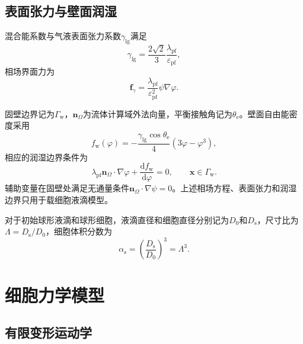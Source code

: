 \subsection{表面张力与壁面润湿}

混合能系数与气液表面张力系数$\gamma_{\mathrm{lg}}$满足
\begin{equation}
\gamma_{\mathrm{lg}}
=
\frac{2\sqrt{2}}{3}
\frac{\lambda_{\mathrm{pf}}}{\varepsilon_{\mathrm{pf}}},
\label{eq:ch2_surface_tension_relation}
\end{equation}
相场界面力为
\begin{equation}
\boldsymbol{f}_{\gamma}
=
\frac{\lambda_{\mathrm{pf}}}{\varepsilon_{\mathrm{pf}}^2}
\psi\nabla\varphi.
\label{eq:ch2_phase_surface_force}
\end{equation}

固壁边界记为$\Gamma_{\mathrm w}$，$\boldsymbol{n}_{\Omega}$为流体计算域外法向量，平衡接触角记为$\theta_{\mathrm e}$。壁面自由能密度采用
\begin{equation}
f_{\mathrm w}(\varphi)
=
-\frac{\gamma_{\mathrm{lg}}\cos\theta_{\mathrm e}}{4}
\left(3\varphi-\varphi^3\right),
\label{eq:ch2_wall_free_energy}
\end{equation}
相应的润湿边界条件为
\begin{equation}
\lambda_{\mathrm{pf}}
\boldsymbol{n}_{\Omega}\cdot\nabla\varphi
+
\frac{\mathrm df_{\mathrm w}}{\mathrm d\varphi}
=0,
\qquad
\boldsymbol{x}\in\Gamma_{\mathrm w}.
\label{eq:ch2_wetting_bc}
\end{equation}
辅助变量在固壁处满足无通量条件$\boldsymbol{n}_{\Omega}\cdot\nabla\psi=0$。上述相场方程、表面张力和润湿边界只用于载细胞液滴模型\cite{deGennes1985wetting,bonn2009wetting,snoeijer2013moving}。

对于初始球形液滴和球形细胞，液滴直径和细胞直径分别记为$D_0$和$D_{\mathrm s}$，尺寸比为$\Lambda=D_{\mathrm s}/D_0$，细胞体积分数为
\begin{equation}
\alpha_{\mathrm s}
=
\left(\frac{D_{\mathrm s}}{D_0}\right)^3
=
\Lambda^3.
\label{eq:ch2_volume_fraction}
\end{equation}

\section{细胞力学模型}

\subsection{有限变形运动学}

